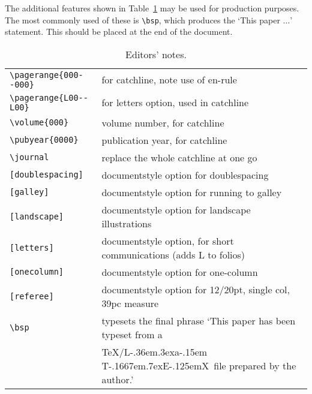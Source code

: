\documentclass[useAMS,usenatbib]{mn2e}
\def\LaTeX{L\kern-.36em\raise.3ex\hbox{a}\kern-.15em
    T\kern-.1667em\lower.7ex\hbox{E}\kern-.125emX}
\begin{document}
The additional features shown in Table~\ref{editors} may be used
for production purposes. The most commonly used of these is \verb"\bsp",
which produces the `This paper $\ldots$' statement. This should be
placed at the end of the document.

\begin{table*}
\begin{minipage}{155mm}
\caption{Editors' notes.}
\label{editors}
\begin{tabular}{@{}lp{270pt}}
\verb"\pagerange{000--000}"& for catchline, note use of en-rule\\
\verb"\pagerange{L00--L00}"& for letters option, used in catchline\\
\verb"\volume{000}" & volume number, for catchline\\
\verb"\pubyear{0000}" & publication year, for catchline\\
\verb"\journal" & replace the whole catchline at one go\\
\verb"[doublespacing]" & documentstyle option for doublespacing\\
\verb"[galley]" & documentstyle option for running to galley\\
\verb"[landscape]" & documentstyle option for landscape illustrations\\
\verb"[letters]" & documentstyle option, for short communications
                   (adds L to folios)\\
\verb"[onecolumn]" & documentstyle option for one-column \\
\verb"[referee]" & documentstyle option for 12/20pt, single col,
                   39pc measure\\
\verb"\bsp" & typesets the final phrase `This paper has been typeset
              from a\\
            & \TeX/\LaTeX\ file prepared by the author.'\\
\end{tabular}
\end{minipage}
\end{table*}



\makeatletter
\def\thebiblio#1{%
 \list{}{\usecounter{dummy}%
         \labelwidth\z@
         \leftmargin 1.5em
         \itemsep \z@
         \itemindent-\leftmargin}
 \reset@font\small
 \parindent\z@
 \parskip\z@ plus .1pt\relax
 \def\newblock{\hskip .11em plus .33em minus .07em}
 \sloppy\clubpenalty4000\widowpenalty4000
 \sfcode`\.=1000\relax
}
\let\endthebiblio=\endlist
\makeatother
\end{document}
